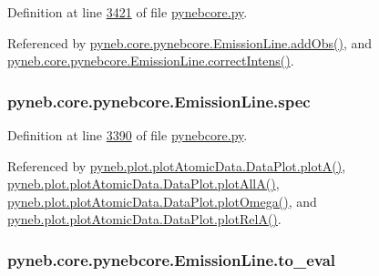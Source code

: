 Definition at line \hyperlink{pynebcore_8py_source_l03421}{3421} of file \hyperlink{pynebcore_8py_source}{pynebcore.\-py}.



Referenced by \hyperlink{pynebcore_8py_source_l03469}{pyneb.\-core.\-pynebcore.\-Emission\-Line.\-add\-Obs()}, and \hyperlink{pynebcore_8py_source_l03447}{pyneb.\-core.\-pynebcore.\-Emission\-Line.\-correct\-Intens()}.

\hypertarget{classpyneb_1_1core_1_1pynebcore_1_1_emission_line_a6de8a145c1cb80aff621c95dc4caabe1}{
\subsubsection[{spec}]{\setlength{\rightskip}{0pt plus 5cm}pyneb.\-core.\-pynebcore.\-Emission\-Line.\-spec}}\label{classpyneb_1_1core_1_1pynebcore_1_1_emission_line_a6de8a145c1cb80aff621c95dc4caabe1}


Definition at line \hyperlink{pynebcore_8py_source_l03390}{3390} of file \hyperlink{pynebcore_8py_source}{pynebcore.\-py}.



Referenced by \hyperlink{plot_atomic_data_8py_source_l00117}{pyneb.\-plot.\-plot\-Atomic\-Data.\-Data\-Plot.\-plot\-A()}, \hyperlink{plot_atomic_data_8py_source_l00189}{pyneb.\-plot.\-plot\-Atomic\-Data.\-Data\-Plot.\-plot\-All\-A()}, \hyperlink{plot_atomic_data_8py_source_l00373}{pyneb.\-plot.\-plot\-Atomic\-Data.\-Data\-Plot.\-plot\-Omega()}, and \hyperlink{plot_atomic_data_8py_source_l00262}{pyneb.\-plot.\-plot\-Atomic\-Data.\-Data\-Plot.\-plot\-Rel\-A()}.

\hypertarget{classpyneb_1_1core_1_1pynebcore_1_1_emission_line_a8b0ab342a873f8ace6c69ed093da5cfa}{
\subsubsection[{to\-\_\-eval}]{\setlength{\rightskip}{0pt plus 5cm}pyneb.\-core.\-pynebcore.\-Emission\-Line.\-to\-\_\-eval}}\label{classpyneb_1_1core_1_1pynebcore_1_1_emission_line_a8b0ab342a873f8ace6c69ed093da5cfa}


